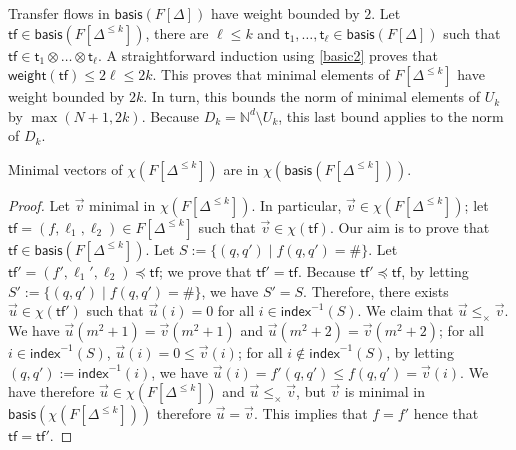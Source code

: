 \documentclass[10pt,a4paper]{article}
\let\mathbb\mathds
\renewcommand{\leq}{\leqslant}
\newcommand{\nats}{\mathbb{N}}
\newcommand{\set}[1]{\{#1\}}
\newcommand{\deff}{:=}
\newcommand{\transitions}{\Delta}
\newcommand*{\abuchistate}{\ell}
\newcommand*{\controlloc}{\abuchistate}
\newcommand*{\dummysymb}{\#}
\newcommand*{\tfweight}[1]{\mathsf{weight}(#1)}
\newcommand*{\minwqo}[1]{\mathsf{basis}(#1)}
\newcommand*{\transfersof}[1]{F[#1]}
\newcommand*{\atf}{\mathsf{tf}}
\newcommand*{\tftimes}{\otimes}
\newcommand*{\letf}{\preceq}
\newcommand{\Tleq}[1]{\transfersof{\transitions^{\leq #1}}}
\newcommand{\T}{\transfersof{\transitions}}
\newcommand*{\leprod}{\leq_{\times}}
\newcommand*{\mapencoding}{\chi}
\newcommand*{\indexof}{\mathsf{index}}
\newcommand*{\tftrans}{\mathsf{t}}
\begin{document}
Transfer flows in \(\minwqo{\T}\) have weight bounded by \(2\).
Let \(\atf \in \minwqo{\Tleq{k}}\), there are \(\ell \leq k\) and \(\tftrans_1,\dots,\tftrans_\ell \in \minwqo{\transfersof{\transitions}}\) such that \(\atf \in \tftrans_1 \tftimes \ldots \tftimes \tftrans_\ell\).
A straightforward induction using \ref{basic2} proves that \(\tfweight{\atf} \leq 2 \ell \leq 2 k\).
This proves that minimal elements of \(\Tleq{k}\) have weight bounded by \(2k\).
In turn, this bounds the norm of minimal elements of \(U_k\) by \(\max(N+1,2k)\).
Because \(D_k = \nats^d \setminus U_k\), this last bound applies to the norm of \(D_k\).

\begin{toappendix}
	\begin{lemma}
		\label{min-Uk-min-Tleqk}
		Minimal vectors of \(\mapencoding(\Tleq{k})\) are in \(\mapencoding(\minwqo{\Tleq{k}})\).
	\end{lemma}
	\begin{proof}
		Let \(\vec{v}\) minimal in \(\mapencoding(\Tleq{k})\).
		In particular, \(\vec{v} \in \mapencoding(\Tleq{k})\); let \(\atf = (f, \controlloc_1, \controlloc_2) \in \Tleq{k}\) such that \(\vec{v} \in \mapencoding(\atf)\).
		Our aim is to prove that \(\atf \in \minwqo{\Tleq{k}}\).
		Let \(S \deff \set{(q,q') \mid f(q,q') = \dummysymb}\).
		Let \(\atf' = (f', \controlloc_1', \controlloc_2) \letf \atf\); we prove that \(\atf' = \atf\).
		Because \(\atf' \letf \atf\), by letting \(S' \deff \set{(q,q') \mid f(q,q') = \dummysymb}\), we have \(S' = S\).
		Therefore, there exists \(\vec{u} \in \mapencoding(\atf')\) such that \(\vec{u}(i) = 0\) for all \(i \in \indexof^{-1}(S)\).
		We claim that \(\vec{u} \leprod \vec{v}\).
		We have \(\vec{u}(m^2+1) = \vec{v}(m^2+1)\) and \(\vec{u}(m^2+2) = \vec{v}(m^2+2)\); for all \(i \in \indexof^{-1}(S)\), \(\vec{u}(i) = 0 \leq \vec{v}(i)\); for all \(i \notin \indexof^{-1}(S)\), by letting \((q,q') \deff \indexof^{-1}(i)\), we have \(\vec{u}(i) = f'(q,q') \leq f(q,q') = \vec{v}(i)\).
		We have therefore \(\vec{u} \in \mapencoding(\Tleq{k})\) and \(\vec{u} \leprod \vec{v}\), but \(\vec{v}\) is minimal in \(\minwqo{\mapencoding(\Tleq{k})}\) therefore \(\vec{u} = \vec{v}\).
		This implies that \(f = f'\) hence that \(\atf = \atf'\).
	\end{proof}


\end{toappendix}
\end{document}
